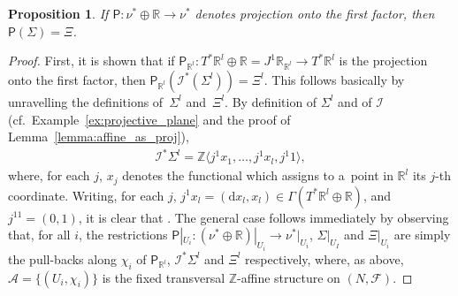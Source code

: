\documentclass[pdftex]{sigma}
\numberwithin{equation}{section}
\newtheorem{Proposition}[Theorem]{Proposition}
\newcommand{\de}{\mathrm{d}} %
\newcommand{\RR}{\mathbb{R}}
\newcommand{\ZZ}{\mathbb{Z}}
\begin{document}
\begin{Proposition}\label{prop:sigma_proj_xi}
If $\mathsf{P} \colon \nu^* \oplus \RR \to \nu^*$ denotes projection onto the first factor, then $\mathsf{P}(\Sigma) = \Xi$.
\end{Proposition}
\begin{proof}
First, it is shown that if $\mathsf{P}_{\RR^l} \colon T^* \RR^l \oplus \RR =J^1\RR_{\RR^l} \to T^*\RR^l$ is the projection onto the f\/irst factor, then
 $\mathsf{P}_{\RR^l}(\mathcal{I}^*(\Sigma^l)) = \Xi^l$. This follows basically by unravelling the def\/initions of~$\Sigma^l$ and~$\Xi^l$. By def\/inition of $\Sigma^l$ and of $\mathcal{I}$ (cf.\ Example~\ref{ex:projective_plane} and the proof of Lemma~\ref{lemma:affine_as_proj}),
 \begin{gather*}
 \mathcal{I}^*\Sigma^l= \ZZ\big \langle j^1x_1,\ldots,j^1x_l, j^1 1\big\rangle,
 \end{gather*}
where, for each $j$, $x_j$ denotes the functional which assigns to a~point in $\RR^l$ its $j$-th coordinate. Writing, for each $j$, $j^1x_l = (\de x_l,x_l) \in \Gamma(T^* \RR^l \oplus \RR)$, and $j^11=(0,1)$, it is clear that \smash{$\mathsf{P}_{\RR^l}(\mathcal{I}^*(\Sigma^l))= \Xi^l$}. The general case follows immediately by observing that, for all $i$, the restrictions $\mathsf{P}|_{U_i} \colon (\nu^* \oplus \RR)|_{U_i} \to \nu^*|_{U_i}$, $\Sigma|_{U_I}$ and $\Xi|_{U_i}$ are simply the pull-backs along $\chi_i$ of $\mathsf{P}_{\RR^l}$, $\mathcal{I}^* \Sigma^l$ and $\Xi^l$ respectively, where, as above, $\mathcal{A} = \{(U_i,\chi_i)\}$ is the f\/ixed transversal $\ZZ$-af\/f\/ine structure on $(N,\mathcal{F})$.
\end{proof}
\end{document}
